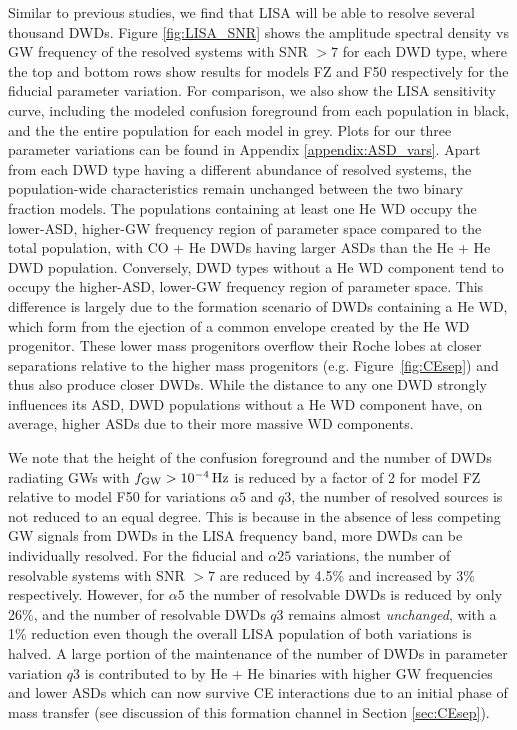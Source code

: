 \documentclass[twocolumn, linenumbers]{aastex631}
\begin{document}
Similar to previous studies, we find that LISA will be able to resolve 
several thousand DWDs. Figure \ref{fig:LISA_SNR} shows the amplitude 
spectral density vs GW frequency of the resolved systems with SNR $> 7$ 
for each DWD type, where the top and bottom rows show results for models 
FZ and F50 respectively for the fiducial parameter variation. For 
comparison, we also show the LISA sensitivity curve, including the 
modeled confusion foreground from each population in black, and the the 
entire population for each model in grey. Plots for our three parameter 
variations can be found in Appendix \ref{appendix:ASD_vars}. Apart from 
each DWD type having a different abundance of resolved systems, the 
population-wide characteristics remain unchanged between the two binary 
fraction models. The populations containing at least one He WD occupy the 
lower-ASD, higher-GW frequency region of parameter space compared to the 
total population, with CO + He DWDs having larger ASDs than the He + He 
DWD population. Conversely, DWD types without a He WD component tend to 
occupy the higher-ASD, lower-GW frequency region of parameter space. This 
difference is largely due to the formation scenario of DWDs containing a 
He WD, which form from the ejection of a common envelope created by the He 
WD progenitor. These lower mass progenitors overflow their Roche lobes at 
closer separations relative to the higher mass progenitors (e.g. 
Figure~\ref{fig:CEsep}) and thus also produce closer DWDs. While the 
distance to any one DWD strongly influences its ASD, DWD populations 
without a He WD component have, on average, higher ASDs due to their more 
massive WD components.


We note that the height of the confusion foreground and the number of DWDs 
radiating GWs with $f_{\rm{GW}} > 10^{-4}\,\rm{Hz}$ is reduced by a factor 
of 2 for model FZ relative to model F50 for variations $\alpha5$ and $q3$, 
the number of resolved sources is not reduced to an equal degree. This is 
because in the absence of less competing GW signals from DWDs in the LISA 
frequency band, more DWDs can be individually resolved. For the fiducial 
and $\alpha25$ variations, the number of resolvable systems with SNR $>7$ 
are reduced by 4.5\% and increased by 3\% respectively. However, for 
$\alpha5$ the number of resolvable DWDs is reduced by only 26\%, and the 
number of resolvable DWDs $q3$ remains almost \emph{unchanged}, with a 1\% 
reduction even though the overall LISA population of both variations is 
halved. A large portion of the maintenance of the number of DWDs in 
parameter variation $q3$ is contributed to by He + He binaries with higher 
GW frequencies and lower ASDs which can now survive CE interactions due to 
an initial phase of mass transfer (see discussion of this formation 
channel in Section \ref{sec:CEsep}).
\end{document}
